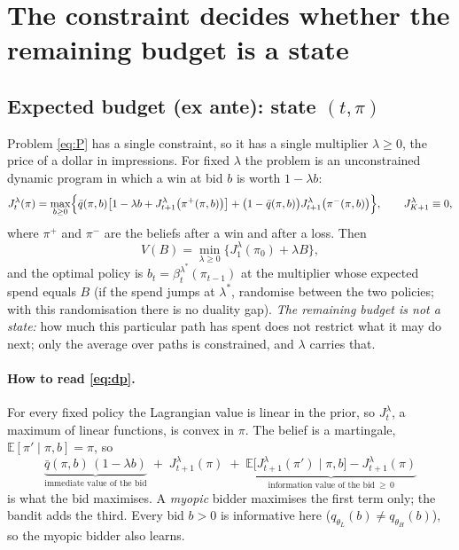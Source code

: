 \documentclass[11pt]{article}
\newcommand{\E}{\mathbb{E}}
\newcommand{\qbar}{\bar q}
\theoremstyle{remark}
\begin{document}
\section{The constraint decides whether the remaining budget is a state}

\subsection{Expected budget (ex ante): state $(t,\pi)$}

Problem \eqref{eq:P} has a single constraint, so it has a single multiplier $\lambda\ge0$, the price of a dollar in
impressions. For fixed $\lambda$ the problem is an unconstrained dynamic program in which a win at bid $b$ is worth
$1-\lambda b$:
\begin{equation}\label{eq:dp}
J^\lambda_t(\pi)=\max_{b\ge0}\Bigl\{\qbar(\pi,b)\bigl[1-\lambda b+J^\lambda_{t+1}\bigl(\pi^{+}(\pi,b)\bigr)\bigr]
+\bigl(1-\qbar(\pi,b)\bigr)J^\lambda_{t+1}\bigl(\pi^{-}(\pi,b)\bigr)\Bigr\},\qquad J^\lambda_{K+1}\equiv0,
\end{equation}
where $\pi^{+}$ and $\pi^{-}$ are the beliefs after a win and after a loss. Then
\[
V(B)=\min_{\lambda\ge0}\bigl\{J^\lambda_1(\pi_0)+\lambda B\bigr\},
\]
and the optimal policy is $b_t=\beta^{\lambda^*}_t(\pi_{t-1})$ at the multiplier whose expected spend equals $B$ (if
the spend jumps at $\lambda^*$, randomise between the two policies; with this randomisation there is no duality gap).
\emph{The remaining budget is not a state:} how much this particular path has spent does not restrict what it may do
next; only the average over paths is constrained, and $\lambda$ carries that.

\paragraph{How to read \eqref{eq:dp}.} For every fixed policy the Lagrangian value is linear in the prior, so
$J^\lambda_t$, a maximum of linear functions, is convex in $\pi$. The belief is a martingale, $\E[\pi'\mid\pi,b]=\pi$, so
\[
\underbrace{\qbar(\pi,b)\,(1-\lambda b)}_{\text{immediate value of the bid}}
\;+\;J^\lambda_{t+1}(\pi)\;+\;
\underbrace{\E\bigl[J^\lambda_{t+1}(\pi')\mid\pi,b\bigr]-J^\lambda_{t+1}(\pi)}_{\text{information value of the bid}\ \ge\,0}
\]
is what the bid maximises. A \emph{myopic} bidder maximises the first term only; the bandit adds the third. Every
bid $b>0$ is informative here ($q_{\theta_L}(b)\ne q_{\theta_H}(b)$), so the myopic bidder also learns.
\end{document}

